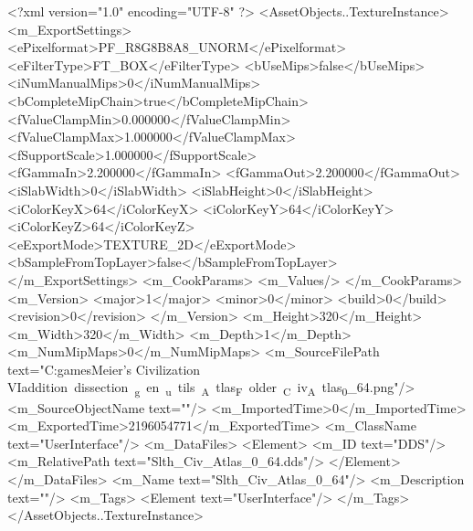 <?xml version="1.0" encoding="UTF-8" ?>
<AssetObjects..TextureInstance>
	<m_ExportSettings>
		<ePixelformat>PF_R8G8B8A8_UNORM</ePixelformat>
		<eFilterType>FT_BOX</eFilterType>
		<bUseMips>false</bUseMips>
		<iNumManualMips>0</iNumManualMips>
		<bCompleteMipChain>true</bCompleteMipChain>
		<fValueClampMin>0.000000</fValueClampMin>
		<fValueClampMax>1.000000</fValueClampMax>
		<fSupportScale>1.000000</fSupportScale>
		<fGammaIn>2.200000</fGammaIn>
		<fGammaOut>2.200000</fGammaOut>
		<iSlabWidth>0</iSlabWidth>
		<iSlabHeight>0</iSlabHeight>
		<iColorKeyX>64</iColorKeyX>
		<iColorKeyY>64</iColorKeyY>
		<iColorKeyZ>64</iColorKeyZ>
		<eExportMode>TEXTURE_2D</eExportMode>
		<bSampleFromTopLayer>false</bSampleFromTopLayer>
	</m_ExportSettings>
	<m_CookParams>
		<m_Values/>
	</m_CookParams>
	<m_Version>
		<major>1</major>
		<minor>0</minor>
		<build>0</build>
		<revision>0</revision>
	</m_Version>
	<m_Height>320</m_Height>
	<m_Width>320</m_Width>
	<m_Depth>1</m_Depth>
	<m_NumMipMaps>0</m_NumMipMaps>
	<m_SourceFilePath text="C:\Users\Sam\Documents\my games\Sid Meier's Civilization VI\Mods\unit addition dissection\python_gen\build_utils\CIV_Atlas_Folder\Slth_Civ_Atlas_0_64.png"/>
	<m_SourceObjectName text=""/>
	<m_ImportedTime>0</m_ImportedTime>
	<m_ExportedTime>2196054771</m_ExportedTime>
	<m_ClassName text="UserInterface"/>
	<m_DataFiles>
		<Element>
			<m_ID text="DDS"/>
			<m_RelativePath text="Slth_Civ_Atlas_0_64.dds"/>
		</Element>
	</m_DataFiles>
	<m_Name text="Slth_Civ_Atlas_0_64"/>
	<m_Description text=""/>
	<m_Tags>
		<Element text="UserInterface"/>
	</m_Tags>
</AssetObjects..TextureInstance>


